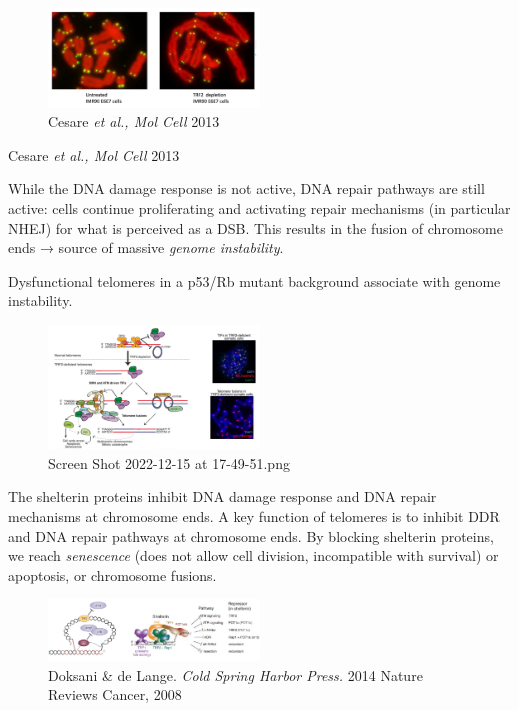 \begin{figure}
\centering
\includegraphics[width=0.5\textwidth]{../_resources/Screen_Shot_2022-12-15_at_17-54-31.png}
\caption{Cesare \emph{et al., Mol Cell} 2013}
\end{figure}

Cesare \emph{et al., Mol Cell} 2013

While the DNA damage response is not active, DNA repair pathways are
still active: cells continue proliferating and activating repair
mechanisms (in particular NHEJ) for what is perceived as a DSB. This
results in the fusion of chromosome ends → source of massive
\emph{genome instability}.

Dysfunctional telomeres in a p53/Rb mutant background associate with
genome instability.

\begin{figure}
\centering
\includegraphics[width=0.5\textwidth]{../_resources/Screen_Shot_2022-12-15_at_17-49-51.png}
\caption{Screen Shot 2022-12-15 at 17-49-51.png}
\end{figure}

The shelterin proteins inhibit DNA damage response and DNA repair
mechanisms at chromosome ends. A key function of telomeres is to inhibit
DDR and DNA repair pathways at chromosome ends. By blocking shelterin
proteins, we reach \emph{senescence} (does not allow cell division,
incompatible with survival) or apoptosis, or chromosome fusions.

\begin{figure}
\centering
\includegraphics[width=0.5\textwidth]{../_resources/Screen_Shot_2022-12-15_at_17-49-02.png}
\caption{Doksani \& de Lange. \emph{Cold Spring Harbor Press.} 2014
Nature Reviews Cancer, 2008}
\end{figure}

